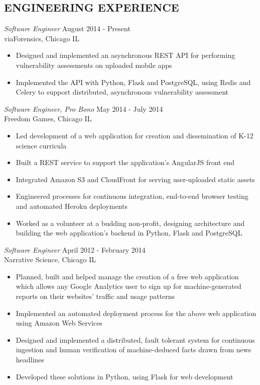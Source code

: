 \documentclass[line,margin]{res}
\begin{document}
\address{waltaskew@gmail.com}
\address{404-819-9796}

\begin{resume}

\section{ENGINEERING EXPERIENCE}
        {\sl Software Engineer} \hfill August 2014 - Present \\
        viaForensics, Chicago IL
        \begin{itemize}
          \item Designed and implemented an asynchronous REST API for
            performing vulnerability assessments on uploaded mobile apps
          \item Implemented the API with Python, Flask and PostgreSQL,
            using Redis and Celery to support distributed, asynchronous
            vulnerability assessment
        \end{itemize}
        {\sl Software Engineer, Pro Bono} \hfill May 2014 - July 2014 \\
        Freedom Games, Chicago IL
        \begin{itemize}
        \item Led development of a web application for creation and
          dissemination of K-12 science curricula
        \item Built a REST service to support the application's AngularJS
          front end
        \item Integrated Amazon S3 and CloudFront for serving
          user-uploaded static assets
        \item Engineered processes for continuous integration, end-to-end
          browser testing and automated Heroku deployments
        \item Worked as a volunteer at a budding non-profit, designing
          architecture and building the web application's backend in
          Python, Flask and PostgreSQL
        \end{itemize}

        {\sl Software Engineer} \hfill April 2012 - February 2014 \\
        Narrative Science, Chicago IL
        \begin{itemize}
        \item Planned, built and helped manage the creation of a
          free web application which allows any Google Analytics
          user to sign up for machine-generated reports on their
          websites' traffic and usage patterns
        \item Implemented an automated deployment process for the
          above web application using Amazon Web Services
        \item Designed and implemented a distributed, fault tolerant
          system for continuous ingestion and human verification of
          machine-deduced facts drawn from news headlines
        \item Developed these solutions in Python, using Flask for
          web development
        \end{itemize}


\end{resume}
\end{document}
